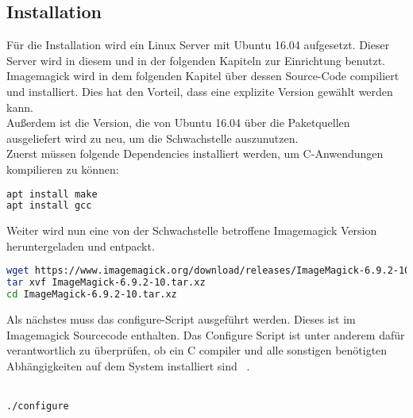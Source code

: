 \subsection{Installation}\label{subsec:installation}

Für die Installation wird ein Linux Server mit Ubuntu 16.04 aufgesetzt.
Dieser Server wird in diesem und in der folgenden Kapiteln zur Einrichtung benutzt.\\

Imagemagick wird in dem folgenden Kapitel über dessen Source-Code compiliert und installiert.
Dies hat den Vorteil, dass eine explizite Version gewählt werden kann.\\

Außerdem ist die Version, die von Ubuntu 16.04 über die Paketquellen ausgeliefert wird zu neu,
um die Schwachstelle auszunutzen.\\

Zuerst müssen folgende Dependencies installiert werden, um C-Anwendungen kompilieren zu können:

\begin{lstlisting}[language=Bash, caption=Imagemagick Installation: Dependencies,label={lst:installdep}]
apt install make
apt install gcc
\end{lstlisting}
\vspace{5mm}

Weiter wird nun eine von der Schwachstelle betroffene Imagemagick Version heruntergeladen und entpackt.
\begin{lstlisting}[language=Bash, caption=Imagemgaick Installation: Source Code herunterladen und entpacken,label={lst:installsource}]
wget https://www.imagemagick.org/download/releases/ImageMagick-6.9.2-10.tar.xz
tar xvf ImageMagick-6.9.2-10.tar.xz
cd ImageMagick-6.9.2-10.tar.xz
\end{lstlisting}
\vspace{5mm}

Als nächstes muss das configure-Script ausgeführt werden.
Dieses ist im Imagemagick Sourcecode enthalten.
Das Configure Script ist unter anderem dafür verantwortlich zu überprüfen,
ob ein C compiler und alle sonstigen benötigten Abhängigkeiten auf dem System installiert sind
~\cite{georgebrocklehurstMagicConfigureMake}.\\\\

\begin{lstlisting}[language=Bash, caption=Imagemagick Installation: Configure,label={lst:installconfigure}]
./configure

\end{lstlisting}
\vspace{5mm}

